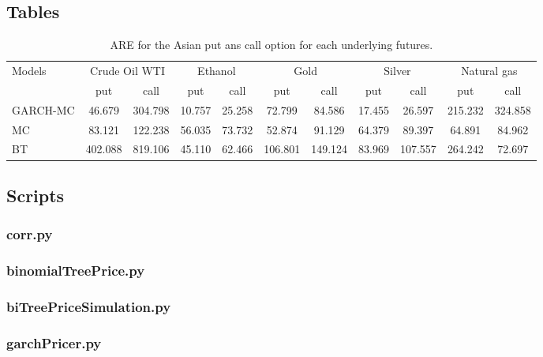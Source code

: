 \documentclass[10pt, a4paper, twocolumn]{article} %
\begin{document}
\subsection{Tables}
\begin{table}[!ht]
	\centering
	\footnotesize
	\begin{tabular}{lcccccccccc}
		\toprule
		\multirow{2}{*}{Models}  & \multicolumn{2}{c}{Crude Oil WTI} & \multicolumn{2}{c}{Ethanol} & \multicolumn{2}{c}{Gold} & \multicolumn{2}{c}{Silver} & \multicolumn{2}{c}{Natural gas} \\
		& put & call & put & call & put & call & put & call & put & call  \\
		\midrule
		GARCH-MC & 46.679 & 304.798 & 10.757 & 25.258 & 72.799 & 84.586 & 17.455 & 26.597 & 215.232 & 324.858 \\ 
		MC & 83.121 & 122.238 & 56.035 & 73.732 & 52.874 & 91.129 & 64.379 & 89.397 & 64.891 & 84.962 \\
		BT & 402.088 & 819.106 & 45.110 & 62.466 & 106.801 & 149.124 & 83.969 & 107.557 & 264.242 & 72.697 \\
		\bottomrule
	\end{tabular}
	\caption{ARE for the Asian put ans call option for each underlying futures.}
	\label{are stat}
\end{table}

\clearpage
\subsection{Scripts}

\subsubsection{corr.py}


\subsubsection{binomialTreePrice.py}


\subsubsection{biTreePriceSimulation.py}


\subsubsection{garchPricer.py}

\end{document}
